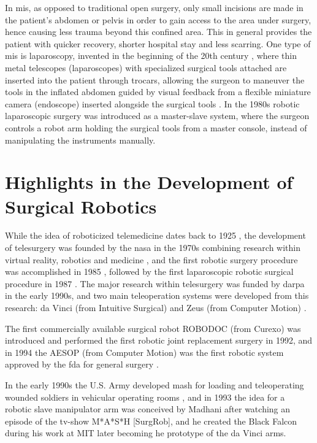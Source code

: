 In \gls{mis}, as opposed to traditional open surgery, only small incisions are made in the patient's abdomen or pelvis in order to gain access to the area under surgery, hence causing less trauma beyond this confined area. This in general provides the patient with quicker recovery, shorter hospital stay and less scarring.
One type of \gls{mis} is \gls{laparoscopy}, invented in the beginning of the 20th century \citep{bib:laparoscopy}, where thin metal telescopes (laparoscopes) with specialized surgical tools attached are inserted into the patient through trocars, allowing the surgeon to maneuver the tools in the inflated abdomen guided by visual feedback from a flexible miniature camera (\gls{endoscope}) inserted alongside the surgical tools \citep{bib:fascrs}.
In the 1980s robotic laparoscopic surgery was introduced as a master-slave system, where the surgeon controls a robot arm holding the surgical tools from a master console, instead of manipulating the instruments manually.

\section{Highlights in the Development of Surgical Robotics}
While the idea of roboticized telemedicine dates back to 1925 \citep{bib:telemed_predict}, the development of telesurgery was founded by the \gls{nasa} in the 1970s \citep{bib:telesurg_history} combining research within virtual reality, robotics and medicine \citep{bib:brown_univ}, and the first robotic surgery procedure was accomplished in 1985 \citep{bib:telesurg_history}, followed by the first laparoscopic robotic surgical procedure in 1987 \citep{bib:brown_univ}.
The major research within telesurgery was funded by \gls{darpa} in the early 1990s, and two main teleoperation systems were developed from this research: da Vinci (from Intuitive Surgical) and Zeus (from Computer Motion) \citep{bib:telesurg_history}.

The first commercially available surgical robot ROBODOC (from Curexo) was introduced and performed the first robotic joint replacement surgery in 1992, and in 1994 the AESOP (from Computer Motion) was the first robotic system approved by the \gls{fda} for general surgery \citep[p 74]{bib:telesurg_history,bib:surgical_book}.

In the early 1990s the U.S. Army developed \gls{mash} for loading and teleoperating wounded soldiers in vehicular operating rooms \citep{bib:brown_univ}, and in 1993 the idea for a robotic slave manipulator arm was conceived by Madhani after watching an episode of the tv-show M*A*S*H [SurgRob], and he created the Black Falcon during his work at MIT \citep{bib:black_falcon} later becoming he prototype of the da Vinci arms.


